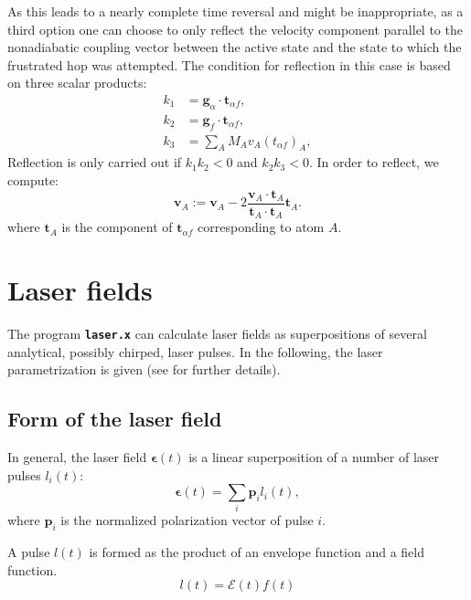 \documentclass[a4paper,10pt,DIV=15,openany]{scrbook}
\newcommand{\ttt}[1]{\textbf{\texttt{#1}}}
\newcommand{\VEC}[1]{\ensuremath{\mathbf{#1}}}
\begin{document}
As this leads to a nearly complete time reversal and might be inappropriate, as a third option one can choose to only reflect the velocity component parallel to the nonadiabatic coupling vector between the active state and the state to which the frustrated hop was attempted.
The condition for reflection in this case is based on three scalar products:
\begin{align}
  k_1&=\VEC{g}_\alpha\cdot \VEC{t}_{\alpha f},\\
  k_2&=\VEC{g}_f\cdot \VEC{t}_{\alpha f},\\
  k_3&=\sum_A M_Av_A(t_{\alpha f})_A,
\end{align}
Reflection is only carried out if $k_1k_2<0$ and $k_2k_3<0$.
In order to reflect, we compute:
\begin{equation}
  \VEC{v}_A:=\VEC{v}_A-2\frac{\VEC{v}_A\cdot\VEC{t}_A}{\VEC{t}_A\cdot\VEC{t}_A}\VEC{t}_A.
\end{equation}
where $\VEC{t}_A$ is the component of $\VEC{t}_{\alpha f}$ corresponding to atom $A$.




\section{Laser fields}\label{met:laser_field}

The program \ttt{laser.x} can calculate laser fields as superpositions of several analytical, possibly chirped, laser pulses. In the following, the laser parametrization is given (see \cite{Marquetand2007} for further details).

\subsection{Form of the laser field}

In general, the laser field $\boldsymbol{\epsilon}(t)$ is a linear superposition of a number of laser pulses $l_i(t)$:
\begin{equation}
  \boldsymbol{\epsilon}(t)=\sum\limits_i \VEC{p}_il_i(t),
\end{equation}
where $\VEC{p}_i$ is the normalized polarization vector of pulse $i$.

A pulse $l(t)$ is formed as the product of an envelope function and a field function. 
\begin{equation}
  l(t)=\mathcal{E}(t)f(t)
\end{equation}
\end{document}
